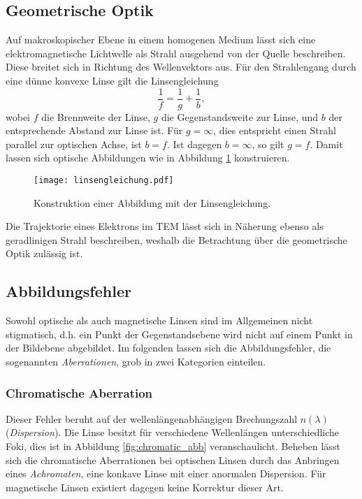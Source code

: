 \subsection{Geometrische Optik}
Auf makroskopischer Ebene in einem homogenen Medium lässt sich eine elektromagnetische Lichtwelle als Strahl ausgehend von der Quelle beschreiben. Diese breitet sich in Richtung des Wellenvektors aus. Für den Strahlengang durch eine dünne konvexe Linse gilt die Linsengleichung
\begin{equation}
\frac{1}{f}=\frac{1}{g}+\frac{1}{b},
\label{eq:abb_gleichung}
\end{equation}
wobei $f$ die Brennweite der Linse, $g$ die Gegenstandsweite zur Linse, und $b$ der entsprechende Abstand zur Linse ist. Für $g=\infty$, dies entspricht einen Strahl parallel zur optischen Achse, ist $b=f$. Ist dagegen $b=\infty$, so gilt $g=f$. Damit lassen sich optische Abbildungen wie in Abbildung \ref{fig:geo_optik} konstruieren.
\begin{figure}[h]
	\centering
	\texttt{[image: linsengleichung.pdf]}
	\caption{Konstruktion einer Abbildung mit der Linsengleichung.}
	\label{fig:geo_optik}
\end{figure}

Die Trajektorie eines Elektrons im TEM lässt sich in Näherung ebenso als geradlinigen Strahl beschreiben, weshalb die Betrachtung über die geometrische Optik zulässig ist.

\subsection{Abbildungsfehler}
Sowohl optische als auch magnetische Linsen sind im Allgemeinen nicht stigmatisch, d.h. ein Punkt der Gegenstandsebene wird nicht auf einem Punkt in der Bildebene abgebildet. Im folgenden lassen sich die Abbildungsfehler, die sogenannten \emph{Aberrationen}, grob in zwei Kategorien einteilen.
\subsubsection{Chromatische Aberration}
Dieser Fehler beruht auf der wellenlängenabhängigen Brechungszahl $n(\lambda)$ (\emph{Dispersion}). Die Linse besitzt für verschiedene Wellenlängen unterschiedliche Foki, dies ist in Abbildung \ref{fig:chromatic_abb} veranschaulicht.
Beheben lässt sich die chromatische Aberrationen bei optischen Linsen durch das Anbringen eines \emph{Achromaten}, eine konkave Linse mit einer anormalen Dispersion. Für magnetische Linsen existiert dagegen keine Korrektur dieser Art.

